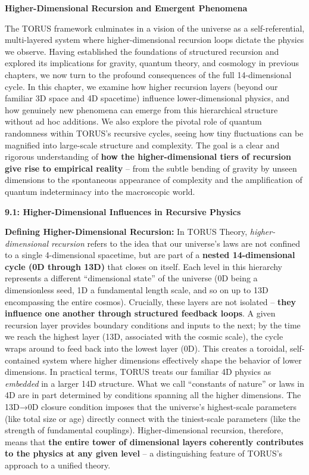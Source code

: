\textbf{Higher-Dimensional Recursion and Emergent Phenomena}

The TORUS framework culminates in a vision of the universe as a
self-referential, multi-layered system where higher-dimensional
recursion loops dictate the physics we observe. Having established the
foundations of structured recursion and explored its implications for
gravity, quantum theory, and cosmology in previous chapters, we now turn
to the profound consequences of the full 14-dimensional cycle. In this
chapter, we examine how higher recursion layers (beyond our familiar 3D
space and 4D spacetime) influence lower-dimensional physics, and how
genuinely new phenomena can emerge from this hierarchical structure
without ad hoc additions. We also explore the pivotal role of quantum
randomness within TORUS's recursive cycles, seeing how tiny fluctuations
can be magnified into large-scale structure and complexity. The goal is
a clear and rigorous understanding of \textbf{how the higher-dimensional
tiers of recursion give rise to empirical reality} -- from the subtle
bending of gravity by unseen dimensions to the spontaneous appearance of
complexity and the amplification of quantum indeterminacy into the
macroscopic world.

\textbf{9.1: Higher-Dimensional Influences in Recursive Physics}

\textbf{Defining Higher-Dimensional Recursion:} In TORUS Theory,
\emph{higher-dimensional recursion} refers to the idea that our
universe's laws are not confined to a single 4-dimensional spacetime,
but are part of a \textbf{nested 14-dimensional cycle (0D through 13D)}
that closes on itself. Each level in this hierarchy represents a
different ``dimensional state'' of the universe (0D being a
dimensionless seed, 1D a fundamental length scale, and so on up to 13D
encompassing the entire cosmos). Crucially, these layers are not
isolated -- \textbf{they influence one another through structured
feedback loops}. A given recursion layer provides boundary conditions
and inputs to the next; by the time we reach the highest layer (13D,
associated with the cosmic scale), the cycle wraps around to feed back
into the lowest layer (0D). This creates a toroidal, self-contained
system where higher dimensions effectively shape the behavior of lower
dimensions. In practical terms, TORUS treats our familiar 4D physics as
\emph{embedded} in a larger 14D structure. What we call ``constants of
nature'' or laws in 4D are in part determined by conditions spanning all
the higher dimensions​. The 13D→0D closure condition imposes that the
universe's highest-scale parameters (like total size or age) directly
connect with the tiniest-scale parameters (like the strength of
fundamental couplings). Higher-dimensional recursion, therefore, means
that \textbf{the entire tower of dimensional layers coherently
contributes to the physics at any given level} -- a distinguishing
feature of TORUS's approach to a unified theory.

